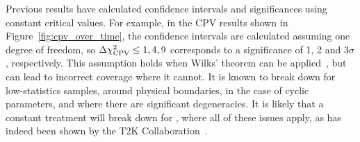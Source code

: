 Previous results have calculated confidence intervals and significances using constant \dchisq critical values. For example, in the CPV results shown in Figure~\ref{fig:cpv_over_time}, the confidence intervals are calculated assuming one degree of freedom, so $\Delta\chi^{2}_{\mathrm{CPV}} \leq 1, 4, 9$ corresponds to a significance of 1, 2 and 3$\sigma$, respectively. This assumption holds when Wilks' theorem can be applied~\cite{wilks}, but can lead to incorrect coverage where it cannot. It is known to break down for low-statistics samples, around physical boundaries, in the case of cyclic parameters, and where there are significant degeneracies. It is likely that a constant \dchisq treatment will break down for \deltacp, where all of these issues apply, as has indeed been shown by the T2K Collaboration~\cite{Abe:2021gky}.

